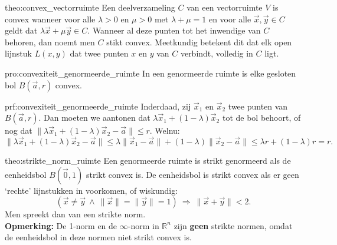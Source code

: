 \begin{theo}{theo:convex_vectorruimte}
    Een deelverzameling $C$ van een vectorruimte $V$ is convex wanneer voor alle $\lambda > 0$ en $\mu >0$ met $\lambda + \mu = 1$ en voor alle $\vec{x},\vec{y} \in C$ geldt dat $\lambda \vec{x} + \mu \vec{y} \in C$. Wanneer al deze punten tot het inwendige van $C$ behoren, dan noemt men $C$ stikt convex. Meetkundig betekent dit dat elk open lijnstuk $L(x,y)$ dat twee punten $x$ en $y$ van $C$ verbindt, volledig in $C$ ligt.
\end{theo}

\begin{pro}{pro:convexiteit_genormeerde_ruimte}
    In een genormeerde ruimte is elke gesloten bol $B(\vec{a},r)$ convex.
\end{pro}

\begin{prf}{prf:convexiteit_genormeerde_ruimte}
    Inderdaad, zij $\vec{x}_1$ en $\vec{x}_2$ twee punten van $B(\vec{a},r)$. Dan moeten we aantonen dat $\lambda\vec{x}_1 + (1-\lambda)\vec{x}_2$ tot de bol behoort, of nog dat $\|\lambda\vec{x}_1 + (1-\lambda)\vec{x}_2 -\vec{a}\| \leq r$. Welnu:
    \begin{equation*}
        \|\lambda\vec{x}_1 + (1-\lambda)\vec{x}_2 -\vec{a}\| \leq \lambda \|\vec{x}_1 - \vec{a}\| + (1 - \lambda)\|\vec{x}_2 - \vec{a}\| \leq \lambda r + (1-\lambda)r = r.
    \end{equation*}
    \vspace{-0.5cm}
\end{prf}

\begin{theo}{theo:strikte_norm_ruimte}
    Een genormeerde ruimte is strikt genormeerd als de eenheidsbol $B(\vec{0},1)$ strikt convex is. De eenheidsbol is strikt convex als er geen `rechte' lijnstukken in voorkomen, of wiskundig:
    \begin{equation*}
        \left( \vec{x} \neq \vec{y} \ \land \ \|\vec{x}\| = \| \vec{y} \| = 1 \right)
        \ \Rightarrow \ \|\vec{x} + \vec{y}\| < 2.
    \end{equation*}
    Men spreekt dan van een strikte norm. \\

    \textbf{Opmerking:} De 1-norm en de $\infty$-norm in $\mathbb{R}^n$ zijn \textbf{geen} strikte normen, omdat de eenheidsbol in deze normen niet strikt convex is.
\end{theo}


